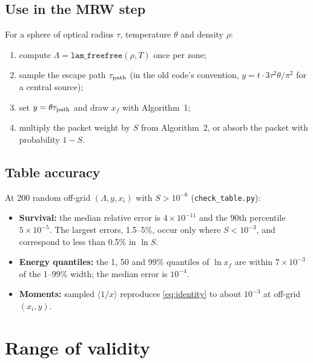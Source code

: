 \documentclass[11pt]{article}
\begin{document}
\subsection{Use in the MRW step}

For a sphere of optical radius $\tau$, temperature $\theta$ and density
$\rho$:
\begin{enumerate}
\item compute $\Lambda=\texttt{lam\_freefree}(\rho,T)$ once per zone;
\item sample the escape path $\tau_{\rm path}$ (in the old code's
  convention, $y=t\cdot3\tau^2\theta/\pi^2$ for a central source);
\item set $y=\theta\tau_{\rm path}$ and draw $x_f$ with Algorithm~1;
\item multiply the packet weight by $S$ from Algorithm~2, or absorb the
  packet with probability $1-S$.
\end{enumerate}

\subsection{Table accuracy}

At 200 random off-grid $(\Lambda,y,x_i)$ with $S>10^{-6}$
(\texttt{check\_table.py}):
\begin{itemize}
\item \textbf{Survival:} the median relative error is $4\times10^{-11}$ and
  the 90th percentile $5\times10^{-5}$. The largest errors, 1.5--5\%, occur
  only where $S<10^{-3}$, and correspond to less than 0.5\% in $\ln S$.
\item \textbf{Energy quantiles:} the 1, 50 and 99\% quantiles of $\ln x_f$
  are within $7\times10^{-3}$ of the 1--99\% width; the median error is
  $10^{-4}$.
\item \textbf{Moments:} sampled $\langle1/x\rangle$ reproduces
  \eqref{eq:identity} to about $10^{-3}$ at off-grid $(x_i,y)$.
\end{itemize}

\section{Range of validity}\label{sec:limits}
\end{document}
